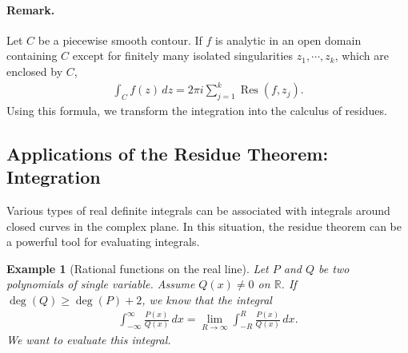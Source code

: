 \documentclass{article}
\numberwithin{equation}{section}
\newcommand{\bbR}{\mathbb{R}}
\DeclareMathOperator{\res}{Res}
\theoremstyle{plain}
\newtheorem{example}[theorem]{Example}
\theoremstyle{definition}
\begin{document}
\paragraph{Remark.} Let $C$ be a piecewise smooth contour. If $f$ is analytic in an open domain containing $C$ except for finitely many isolated singularities $z_1,\cdots,z_k$, which are enclosed by $C$,
\begin{align*}
	\int_C f(z)\,dz=2\pi i\sum_{j=1}^k\res(f,z_j).
\end{align*}
Using this formula, we transform the integration into the calculus of residues.

\subsection{Applications of the Residue Theorem: Integration}
Various types of real definite integrals can be associated with integrals around closed curves in the complex plane. In this situation, the residue theorem can be a powerful tool for evaluating integrals.
\begin{example}[Rational functions on the real line]\label{rationalint} 
Let $P$ and $Q$ be two polynomials of single variable. Assume $Q(x)\neq 0$ on $\bbR$. If $\deg(Q)\geq\deg(P)+2$, we know that the integral
\begin{align*}
	\int_{-\infty}^\infty \frac{P(x)}{Q(x)}\,dx=\lim_{R\to\infty}\int_{-R}^R \frac{P(x)}{Q(x)}\,dx.
\end{align*}
We want to evaluate this integral.
\end{example}
\end{document}
